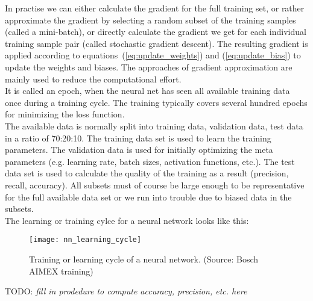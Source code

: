 In practise we can either calculate the gradient for the full training set, or rather
approximate the gradient by selecting a random subset of the training samples (called a
mini-batch), or directly calculate the gradient we get for each individual training sample
pair (called stochastic gradient descent). The resulting gradient is applied according
to equations~(\ref{eq:update_weights}) and (\ref{eq:update_bias}) to update the weights
and biases. The approaches of gradient approximation are mainly used to reduce the
computational effort. \\

It is called an epoch, when the neural net has seen all available training data once
during a training cycle. The training typically covers several hundred epochs for
minimizing the loss function. \\

The available data is normally split into training data, validation data, test data in a
ratio of 70:20:10. The training data set is used to learn the training parameters. The
validation data is used for initially optimizing the meta parameters (e.g. learning rate,
batch sizes, activation functions, etc.). The test data set is used to calculate the
quality of the training as a result (precision, recall, accuracy). All subsets must of
course be large enough to be representative for the full available data set or we run into
trouble due to biased data in the subsets. \\

The learning or training cylce for a neural network looks like this:
\begin{figure}[h] \centering \texttt{[image: nn\_learning\_cycle]}
    \caption{Training or learning cycle of a neural network.
    (Source: Bosch AIMEX training)}
    \label{fig:training_cycle}
\end{figure}

TODO: \emph{fill in prodedure to compute accuracy, precision, etc. here}

\newpage
